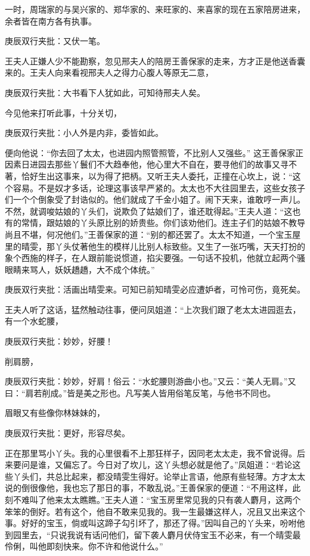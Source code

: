 \begin{parag}
    一时，周瑞家的与吴兴家的、郑华家的、来旺家的、来喜家的现在五家陪房进来，余者皆在南方各有执事。\begin{note}庚辰双行夹批：又伏一笔。\end{note}王夫人正嫌人少不能勘察，忽见邢夫人的陪房王善保家的走来，方才正是他送香囊来的。王夫人向来看视邢夫人之得力心腹人等原无二意，\begin{note}庚辰双行夹批：大书看下人犹如此，可知待邢夫人矣。\end{note}今见他来打听此事，十分关切，\begin{note}庚辰双行夹批：小人外是内非，委皆如此。\end{note}便向他说：“你去回了太太，也进园内照管照管，不比别人又强些。” 这王善保家正因素日进园去那些丫鬟们不大趋奉他，他心里大不自在，要寻他们的故事又寻不著，恰好生出这事来，以为得了把柄。又听王夫人委托，正撞在心坎上，说：“这个容易。不是奴才多话，论理这事该早严紧的。太太也不大往园里去，这些女孩子们一个个倒象受了封诰似的。他们就成了千金小姐了。闹下天来，谁敢哼一声儿。不然，就调唆姑娘的丫头们，说欺负了姑娘们了，谁还耽得起。”王夫人道：“这也有的常情，跟姑娘的丫头原比别的娇贵些。你们该劝他们。连主子们的姑娘不教导尚且不堪，何况他们。”王善保家的道：“别的都还罢了。太太不知道，一个宝玉屋里的晴雯，那丫头仗著他生的模样儿比别人标致些。又生了一张巧嘴，天天打扮的象个西施的样子，在人跟前能说惯道，掐尖要强。一句话不投机，他就立起两个骚眼睛来骂人，妖妖趫趫，大不成个体统。”\begin{note}庚辰双行夹批：活画出晴雯来。可知已前知晴雯必应遭妒者，可怜可伤，竟死矣。\end{note}王夫人听了这话，猛然触动往事，便问凤姐道：“上次我们跟了老太太进园逛去，有一个水蛇腰，\begin{note}庚辰双行夹批：妙妙，好腰！\end{note}削肩膀，\begin{note}庚辰双行夹批：妙妙，好肩！俗云：“水蛇腰则游曲小也。”又云：“美人无肩。”又曰：“肩若削成。”皆是美之形也。凡写美人皆用俗笔反笔，与他书不同也。\end{note}眉眼又有些像你林妹妹的，\begin{note}庚辰双行夹批：更好，形容尽矣。\end{note}正在那里骂小丫头。我的心里很看不上那狂样子，因同老太太走，我不曾说得。后来要问是谁，又偏忘了。今日对了坎儿，这丫头想必就是他了。”凤姐道：“若论这些丫头们，共总比起来，都没晴雯生得好。论举止言语，他原有些轻薄。方才太太说的倒很像他，我也忘了那日的事，不敢乱说。”王善保家的便道：“不用这样，此刻不难叫了他来太太瞧瞧。”王夫人道：“宝玉房里常见我的只有袭人麝月，这两个笨笨的倒好。若有这个，他自不敢来见我的。我一生最嫌这样人，况且又出来这个事。好好的宝玉，倘或叫这蹄子勾引坏了，那还了得。”因叫自己的丫头来，吩咐他到园里去，“只说我说有话问他们，留下袭人麝月伏侍宝玉不必来，有一个晴雯最伶俐，叫他即刻快来。你不许和他说什么。”
\end{parag}


